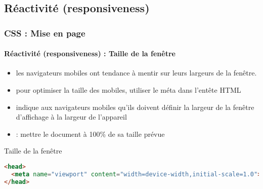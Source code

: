 \documentclass[xcolor=table]{beamer}
\begin{document}
\subsection{Réactivité (responsiveness)}

\begin{frame}[fragile]
\frametitle{CSS : Mise en page}
\framesubtitle{Réactivité (responsiveness) : Taille de la fenêtre}

	\begin{itemize}
		\item les navigateurs mobiles ont tendance à mentir sur leurs largeurs de la fenêtre.
		\item pour optimiser la taille des mobiles, utiliser le méta  dans l'entête HTML
		\item {} indique aux navigateurs mobiles qu'ils doivent définir la largeur de la fenêtre d'affichage à la largeur de l'appareil
		\item {} : mettre le document à 100\% de sa taille prévue
	\end{itemize}
%
	\begin{block}{Taille de  la fenêtre}
		\lstset{escapeinside=**}
		\scriptsize\bfseries
\begin{lstlisting}[language={html}]
<head>
  <meta name="viewport" content="width=device-width,initial-scale=1.0">
</head>
\end{lstlisting}
	\end{block}
\end{frame}
\end{document}
